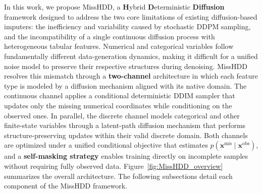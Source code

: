 \documentclass[times, review, 10pt]{elsarticle}
\begin{document}
In this work, we propose MissHDD, a \textbf{H}ybrid \textbf{D}eterministic \textbf{Diffusion} framework designed to address the two core limitations of existing diffusion-based imputers: the inefficiency and variability caused by stochastic DDPM sampling, and the incompatibility
of a single continuous diffusion process with heterogeneous tabular
features. Numerical and categorical variables follow fundamentally different
data-generation dynamics, making it difficult for a unified noise model to
preserve their respective structures during denoising. MissHDD resolves this
mismatch through a \textbf{two-channel} architecture in which each feature type is
modeled by a diffusion mechanism aligned with its native domain. The continuous channel applies a conditional deterministic DDIM sampler that updates only the missing numerical coordinates while conditioning on the observed ones. In parallel, the discrete channel models categorical and other
finite-state variables through a latent-path diffusion mechanism that performs
structure-preserving updates within their valid discrete domain. Both channels are optimized under a unified conditional objective that
estimates \(p(\mathbf{x}^{\mathrm{mis}} \mid \mathbf{x}^{\mathrm{obs}})\), and a
\textbf{self-masking strategy} enables training directly on incomplete samples without
requiring fully observed data. Figure~\ref{fig:MissHDD_overview} summarizes
the overall architecture. The following subsections detail each component of
the MissHDD framework.
\end{document}
